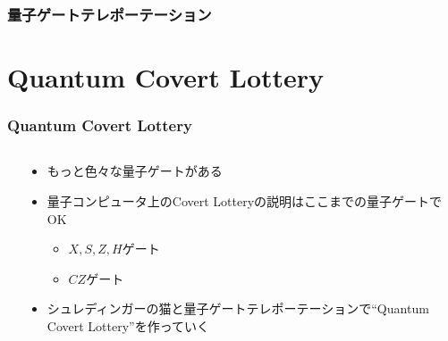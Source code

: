 \begin{frame}
  \frametitle{量子ゲートテレポーテーション}


  \pause

  \pause
\end{frame}

\section{Quantum Covert Lottery}

\begin{frame}
  \frametitle{Quantum Covert Lottery}

  \begin{columns}
    \begin{column}{0.55\textwidth}
      \begin{minipage}[t][.6\textheight][t]{\textwidth}
        \tableofcontents[currentsection]
      \end{minipage}
    \end{column}
    \begin{column}{0.45\textwidth}
      \pause
      \begin{itemize}
        \item<+-> もっと色々な量子ゲートがある

        \item<+-> 量子コンピュータ上のCovert Lotteryの説明はここまでの量子ゲートでOK
        \begin{itemize}
          \item $X, S, Z, H$ゲート
          \item $CZ$ゲート
        \end{itemize}
        
        \item<+-> シュレディンガーの猫と量子ゲートテレポーテーションで``Quantum Covert Lottery''を作っていく
      \end{itemize}
    \end{column}
  \end{columns}
\end{frame}

